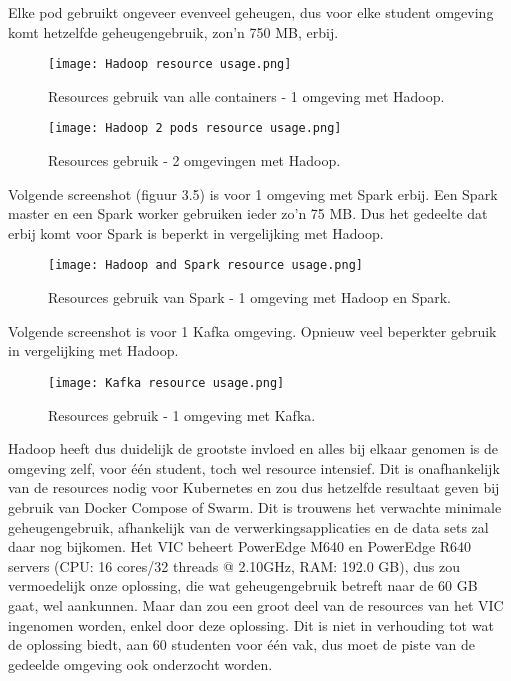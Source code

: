 Elke pod gebruikt ongeveer evenveel geheugen, dus voor elke student omgeving komt hetzelfde geheugengebruik, zon'n 750 MB, erbij.

\begin{figure}[H]
    \texttt{[image: Hadoop resource usage.png]}
    \caption{Resources gebruik van alle containers - 1 omgeving met Hadoop.}
\end{figure}

\begin{figure}[H]
    \texttt{[image: Hadoop 2 pods resource usage.png]}
    \caption{Resources gebruik - 2 omgevingen met Hadoop.}
\end{figure}

Volgende screenshot (figuur 3.5) is voor 1 omgeving met Spark erbij. Een Spark master en een Spark worker gebruiken ieder zo'n 75 MB. Dus het gedeelte dat erbij komt voor Spark is beperkt in vergelijking met Hadoop.
\begin{figure}[H]
    \texttt{[image: Hadoop and Spark resource usage.png]}
    \caption{Resources gebruik van Spark - 1 omgeving met Hadoop en Spark.}
\end{figure}

Volgende screenshot is voor 1 Kafka omgeving. Opnieuw veel beperkter gebruik in vergelijking met Hadoop.
\begin{figure}[H]
    \texttt{[image: Kafka resource usage.png]}
    \caption{Resources gebruik - 1 omgeving met Kafka.}
\end{figure}

Hadoop heeft dus duidelijk de grootste invloed en alles bij elkaar genomen is de omgeving zelf, voor \'e\'en student, toch wel resource intensief. Dit is onafhankelijk van de resources nodig voor Kubernetes en zou dus hetzelfde resultaat geven bij gebruik van Docker Compose of Swarm.
\newline
Dit is trouwens het verwachte minimale geheugengebruik, afhankelijk van de verwerkingsapplicaties en de data sets zal daar nog bijkomen.
\newline
Het VIC beheert PowerEdge M640 en PowerEdge R640 servers (CPU: 16 cores/32 threads @ 2.10GHz, RAM: 192.0 GB), dus zou vermoedelijk onze oplossing, die wat geheugengebruik betreft naar de 60 GB gaat, wel aankunnen.
Maar dan zou een groot deel van de resources van het VIC ingenomen worden, enkel door deze oplossing. Dit is niet in verhouding tot wat de oplossing biedt, aan 60 studenten voor \'e\'en vak, dus moet de piste van de gedeelde omgeving ook onderzocht worden.

